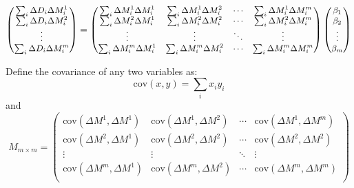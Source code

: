 \begin{equation}
    \small
    \begin{pmatrix}
	\sum_i \Delta D_i \Delta M_i^1 \\
	\sum_i \Delta D_i \Delta M_i^2 \\
	\vdots	\\
	\sum_i \Delta D_i \Delta M_i^m \\
    \end{pmatrix}
    = 
    \begin{pmatrix}
	\sum_i \Delta M_i^1 \Delta M_i^1    & \sum_i \Delta M_i^1 \Delta M_i^2	&
	\cdots	& \sum_i \Delta M_i^1 \Delta M_i^m  \\
	\sum_i \Delta M_i^2 \Delta M_i^1    & \sum_i \Delta M_i^2 \Delta M_i^2	&
	\cdots	& \sum_i \Delta M_i^2 \Delta M_i^m  \\
	\vdots	& \vdots    & \ddots	& \vdots    \\
	\sum_i \Delta M_i^m \Delta M_i^1    & \sum_i \Delta M_i^m \Delta M_i^2	&
	\cdots	& \sum_i \Delta M_i^m \Delta M_i^m  \\
    \end{pmatrix}
    \begin{pmatrix}
	\beta_1 \\
	\beta_2 \\
	\vdots	\\
	\beta_m \\ 
    \end{pmatrix}
\end{equation}

Define the covariance of any two variables as:
\begin{equation}
    \text{cov}(x, y) = \sum_i x_i y_i
\end{equation}
and
\begin{equation}
    M_{m \times m} = 
    \begin{pmatrix}
	\text{cov}(\Delta M^1, \Delta M^1) & \text{cov}(\Delta M^1, \Delta M^2)   & \cdots & \text{cov}(\Delta M^1, \Delta M^m)  \\
	\text{cov}(\Delta M^2, \Delta M^1) & \text{cov}(\Delta M^2, \Delta M^2)   & \cdots & \text{cov}(\Delta M^2, \Delta M^2)  \\
	\vdots	& \vdots    & \ddots	& \vdots    \\
	\text{cov}(\Delta M^m, \Delta M^1) & \text{cov}(\Delta M^m, \Delta M^2)   & \cdots & \text{cov}(\Delta M^m, \Delta M^m)  \\
    \end{pmatrix}
    \label{eq:M_definition}
\end{equation}

